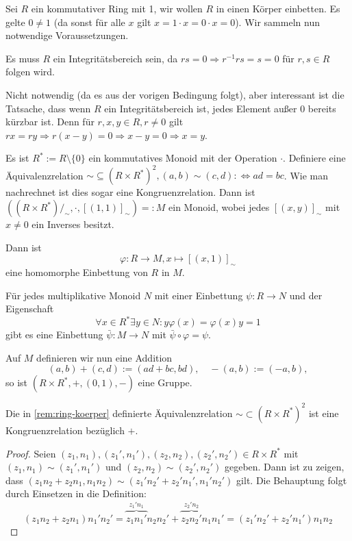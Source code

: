\begin{remark}\label{rem:ring-koerper}
    Sei $R$ ein kommutativer Ring mit 1, wir wollen $R$ in einen Körper einbetten. Es gelte \obda $0 \neq 1$ (da sonst für alle $x$ gilt $ x = 1\cdot x = 0 \cdot x = 0$). Wir sammeln nun notwendige Voraussetzungen.

    Es muss $R$ ein Integritätsbereich sein, da $rs=0\Rightarrow r^{-1}rs=s=0$ für $r,s\in R$ folgen wird.

    Nicht notwendig (da es aus der vorigen Bedingung folgt), aber interessant ist die Tatsache, dass wenn $R$ ein Integritätsbereich ist, jedes Element außer $0$ bereits kürzbar ist.
    Denn für $r,x,y\in R,r\neq 0$ gilt $rx=ry\Rightarrow r(x-y)=0\Rightarrow x-y=0\Rightarrow x=y$.

    Es ist $R^* := R \setminus \{0\}$ ein kommutatives Monoid mit der Operation $\cdot$. Definiere eine Äquivalenz\-relation $\sim \subseteq (R \times R^*)^2, (a, b) \sim (c, d) :\Leftrightarrow ad = bc$. Wie man nachrechnet ist dies sogar eine Kongruenzrelation. Dann ist $((R \times R^*)/_\sim, \cdot, [(1,1)]_\sim) =: M$ ein Monoid, wobei jedes $[(x,y)]_\sim$ mit $x \neq 0$ ein Inverses besitzt.
    
    Dann ist
    $$ \varphi : R \to M, x \mapsto [(x, 1)]_\sim $$
    eine homomorphe Einbettung von $R$ in $M$.

    Für jedes multiplikative Monoid $N$ mit einer Einbettung $\psi : R \to N$ und der Eigenschaft
    $$\forall x\in R^*\exists y\in N:y\varphi(x)=\varphi(x)y=1$$
    gibt es eine Einbettung $\bar{\psi} : M \to N$ mit $\bar{\psi} \circ \varphi = \psi$.

    Auf $M$ definieren wir nun eine Addition
    $$ (a,b) + (c,d) := (ad+bc, bd), \quad -(a,b) := (-a, b), $$
    so ist $(R \times R^*, +, (0,1), -)$ eine Gruppe.
\end{remark}

\begin{lemma}
    Die in \cref{rem:ring-koerper} definierte Äquivalenzrelation $\sim \subset (R \times R^*)^2$ ist eine Kongruenzrelation bezüglich $+$.
\end{lemma}

\begin{proof}
    Seien $(z_1,n_1),(z_1',n_1'),(z_2,n_2),(z_2',n_2')\in R\times R^*$ mit $(z_1,n_1)\sim (z_1',n_1')$ und $(z_2,n_2)\sim (z_2',n_2')$ gegeben.
    Dann ist zu zeigen, dass $(z_1n_2+z_2n_1,n_1n_2)\sim (z_1'n_2'+z_2'n_1',n_1'n_2')$ gilt. Die Behauptung folgt durch Einsetzen
    in die Definition:
    $$(z_1n_2+z_2n_1)n_1'n_2'=\overbrace{z_1n_1'}^{z_1'n_1}n_2n_2'+\overbrace{z_2n_2'}^{z_2'n_2}n_1n_1'=(z_1'n_2'+z_2'n_1')n_1n_2$$
\end{proof}

